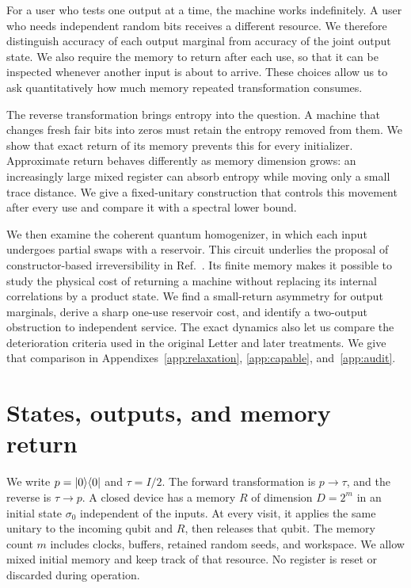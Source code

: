 \documentclass[aps,pra,reprint,superscriptaddress,longbibliography,nofootinbib,floatfix]{revtex4-2}
\begin{document}
For a user who tests one output at a time, the machine works indefinitely. A user who needs independent random bits receives a different resource. We therefore distinguish accuracy of each output marginal from accuracy of the joint output state. We also require the memory to return after each use, so that it can be inspected whenever another input is about to arrive. These choices allow us to ask quantitatively how much memory repeated transformation consumes.

The reverse transformation brings entropy into the question. A machine that changes fresh fair bits into zeros must retain the entropy removed from them. We show that exact return of its memory prevents this for every initializer. Approximate return behaves differently as memory dimension grows: an increasingly large mixed register can absorb entropy while moving only a small trace distance. We give a fixed-unitary construction that controls this movement after every use and compare it with a spectral lower bound.

We then examine the coherent quantum homogenizer, in which each input undergoes partial swaps with a reservoir. This circuit underlies the proposal of constructor-based irreversibility in Ref.~\cite{prl}. Its finite memory makes it possible to study the physical cost of returning a machine without replacing its internal correlations by a product state. We find a small-return asymmetry for output marginals, derive a sharp one-use reservoir cost, and identify a two-output obstruction to independent service. The exact dynamics also let us compare the deterioration criteria used in the original Letter and later treatments. We give that comparison in Appendixes~\ref{app:relaxation}, \ref{app:capable}, and~\ref{app:audit}.

\section{States, outputs, and memory return}\label{sec:contracts}

We write $p=|0\rangle\langle0|$ and $\tau=I/2$. The forward transformation is $p\to\tau$, and the reverse is $\tau\to p$. A closed device has a memory $R$ of dimension $D=2^m$ in an initial state $\sigma_0$ independent of the inputs. At every visit, it applies the same unitary to the incoming qubit and $R$, then releases that qubit. The memory count $m$ includes clocks, buffers, retained random seeds, and workspace. We allow mixed initial memory and keep track of that resource. No register is reset or discarded during operation.
\end{document}
